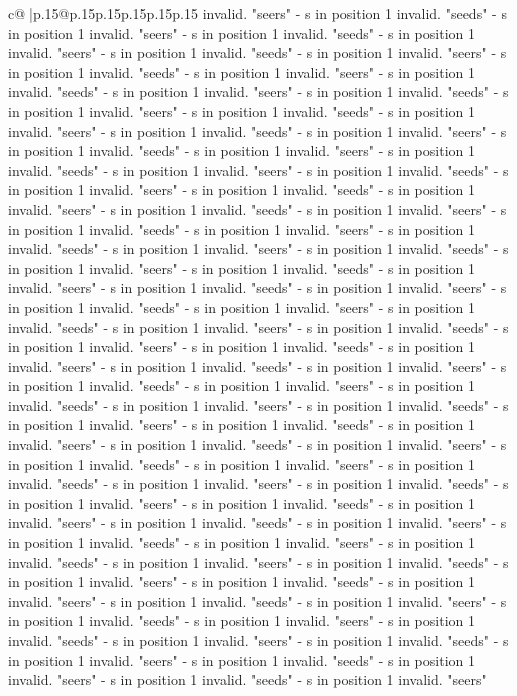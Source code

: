 \documentclass{article}
\begin{document}
{\begin{supertabular}{c@{$\;$}|p{.15\linewidth}@{}p{.15\linewidth}p{.15\linewidth}p{.15\linewidth}p{.15\linewidth}p{.15\linewidth}}
{{{invalid. "seers" {-} s in position 1 invalid. "seeds" {-} s in position 1 invalid. "seers" {-} s in position 1 invalid. "seeds" {-} s in position 1 invalid. "seers" {-} s in position 1 invalid. "seeds" {-} s in position 1 invalid. "seers" {-} s in position 1 invalid. "seeds" {-} s in position 1 invalid. "seers" {-} s in position 1 invalid. "seeds" {-} s in position 1 invalid. "seers" {-} s in position 1 invalid. "seeds" {-} s in position 1 invalid. "seers" {-} s in position 1 invalid. "seeds" {-} s in position 1 invalid. "seers" {-} s in position 1 invalid. "seeds" {-} s in position 1 invalid. "seers" {-} s in position 1 invalid. "seeds" {-} s in position 1 invalid. "seers" {-} s in position 1 invalid. "seeds" {-} s in position 1 invalid. "seers" {-} s in position 1 invalid. "seeds" {-} s in position 1 invalid. "seers" {-} s in position 1 invalid. "seeds" {-} s in position 1 invalid. "seers" {-} s in position 1 invalid. "seeds" {-} s in position 1 invalid. "seers" {-} s in position 1 invalid. "seeds" {-} s in position 1 invalid. "seers" {-} s in position 1 invalid. "seeds" {-} s in position 1 invalid. "seers" {-} s in position 1 invalid. "seeds" {-} s in position 1 invalid. "seers" {-} s in position 1 invalid. "seeds" {-} s in position 1 invalid. "seers" {-} s in position 1 invalid. "seeds" {-} s in position 1 invalid. "seers" {-} s in position 1 invalid. "seeds" {-} s in position 1 invalid. "seers" {-} s in position 1 invalid. "seeds" {-} s in position 1 invalid. "seers" {-} s in position 1 invalid. "seeds" {-} s in position 1 invalid. "seers" {-} s in position 1 invalid. "seeds" {-} s in position 1 invalid. "seers" {-} s in position 1 invalid. "seeds" {-} s in position 1 invalid. "seers" {-} s in position 1 invalid. "seeds" {-} s in position 1 invalid. "seers" {-} s in position 1 invalid. "seeds" {-} s in position 1 invalid. "seers" {-} s in position 1 invalid. "seeds" {-} s in position 1 invalid. "seers" {-} s in position 1 invalid. "seeds" {-} s in position 1 invalid. "seers" {-} s in position 1 invalid. "seeds" {-} s in position 1 invalid. "seers" {-} s in position 1 invalid. "seeds" {-} s in position 1 invalid. "seers" {-} s in position 1 invalid. "seeds" {-} s in position 1 invalid. "seers" {-} s in position 1 invalid. "seeds" {-} s in position 1 invalid. "seers" {-} s in position 1 invalid. "seeds" {-} s in position 1 invalid. "seers" {-} s in position 1 invalid. "seeds" {-} s in position 1 invalid. "seers" {-} s in position 1 invalid. "seeds" {-} s in position 1 invalid. "seers" {-} s in position 1 invalid. "seeds" {-} s in position 1 invalid. "seers" {-} s in position 1 invalid. "seeds" {-} s in position 1 invalid. "seers" {-} s in position 1 invalid. "seeds" {-} s in position 1 invalid. "seers" {-} s in position 1 invalid. "seeds" {-} s in position 1 invalid. "seers" {-} s in position 1 invalid. "seeds" {-} s in position 1 invalid. "seers" {-} s in position 1 invalid. "seeds" {-} s in position 1 invalid. "seers" {-} s in position 1 invalid. "seeds" {-} s in position 1 invalid. "seers" {-} s in position 1 invalid. "seeds" {-} s in position 1 invalid. "seers" {-} s in position 1 invalid. "seeds" {-} s in position 1 invalid. "seers" }}}
\end{supertabular}}
\end{document}
